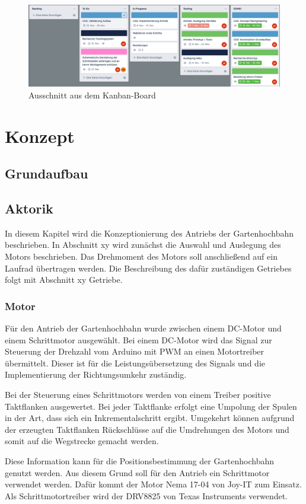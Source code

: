 \begin{figure}[h]
	\includegraphics[width=17cm]{kanban.png}
	\caption{Ausschnitt aus dem Kanban-Board}
	\label{pic:kanban}
\end{figure}


\chapter{Konzept}

\section{Grundaufbau}
\section{Aktorik}
In diesem Kapitel wird die Konzeptionierung des Antriebs der Gartenhochbahn beschrieben. In Abschnitt xy wird zunächst die Auswahl und Auslegung des Motors beschrieben. Das Drehmoment des Motors soll anschließend auf ein Laufrad übertragen werden. Die Beschreibung des dafür zuständigen Getriebes folgt mit Abschnitt xy Getriebe. 

\subsection{Motor}
Für den Antrieb der Gartenhochbahn wurde zwischen einem DC-Motor und einem Schrittmotor ausgewählt. 
Bei einem DC-Motor wird das Signal zur Steuerung der Drehzahl vom Arduino mit PWM an einen Motortreiber übermittelt. Dieser ist für die Leistungsübersetzung des Signals und die Implementierung der Richtungsumkehr zuständig. 

Bei der Steuerung eines Schrittmotors werden von einem Treiber positive Taktflanken ausgewertet. Bei jeder Taktflanke erfolgt eine Umpolung der Spulen in der Art, dass sich ein Inkrementalschritt ergibt. Umgekehrt können aufgrund der erzeugten Taktflanken Rückschlüsse auf die Umdrehungen des Motors und somit auf die Wegstrecke gemacht werden. 

Diese Information kann für die Positionsbestimmung der Gartenhochbahn genutzt werden. Aus diesem Grund soll für den Antrieb ein Schrittmotor verwendet werden. Dafür kommt der Motor Nema 17-04 von Joy-IT zum Einsatz. Als Schrittmotortreiber wird der DRV8825 von Texas Instruments verwendet. 


